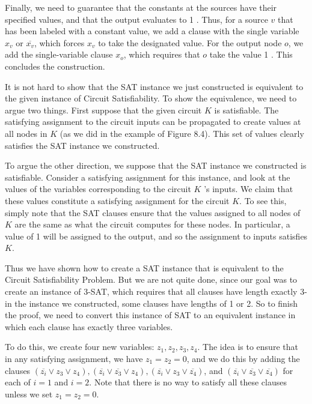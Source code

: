\documentclass[a4paper, 12pt]{book}
\theoremstyle{dotless}
\begin{document}
Finally, we need to guarantee that the constants at the sources have their specified values, and that the output evaluates to 1 . Thus, for a source $v$ that has been labeled with a constant value, we add a clause with the single variable $x_{v}$ or $\overline{x_{v}}$, which forces $x_{v}$ to take the designated value. For the output node $o$, we add the single-variable clause $x_{o}$, which requires that $o$ take the value 1 . This concludes the construction.

It is not hard to show that the SAT instance we just constructed is equivalent to the given instance of Circuit Satisfiability. To show the equivalence, we need to argue two things. First suppose that the given circuit $K$ is satisfiable. The satisfying assignment to the circuit inputs can be propagated to create values at all nodes in $K$ (as we did in the example of Figure 8.4). This set of values clearly satisfies the SAT instance we constructed.

To argue the other direction, we suppose that the SAT instance we constructed is satisfiable. Consider a satisfying assignment for this instance, and look at the values of the variables corresponding to the circuit $K$ 's inputs. We claim that these values constitute a satisfying assignment for the circuit $K$. To see this, simply note that the SAT clauses ensure that the values assigned to all nodes of $K$ are the same as what the circuit computes for these nodes. In particular, a value of 1 will be assigned to the output, and so the assignment to inputs satisfies $K$.

Thus we have shown how to create a SAT instance that is equivalent to the Circuit Satisfiability Problem. But we are not quite done, since our goal was to create an instance of 3-SAT, which requires that all clauses have length exactly 3-in the instance we constructed, some clauses have lengths of 1 or 2. So to finish the proof, we need to convert this instance of SAT to an equivalent instance in which each clause has exactly three variables.

To do this, we create four new variables: $z_{1}, z_{2}, z_{3}, z_{4}$. The idea is to ensure that in any satisfying assignment, we have $z_{1}=z_{2}=0$, and we do this by adding the clauses $\left(\overline{z_{i}} \vee z_{3} \vee z_{4}\right),\left(\overline{z_{i}} \vee \overline{z_{3}} \vee z_{4}\right),\left(\overline{z_{i}} \vee z_{3} \vee \overline{z_{4}}\right)$, and $\left(\overline{z_{i}} \vee \overline{z_{3}} \vee \overline{z_{4}}\right)$ for each of $i=1$ and $i=2$. Note that there is no way to satisfy all these clauses unless we set $z_{1}=z_{2}=0$.
\end{document}

